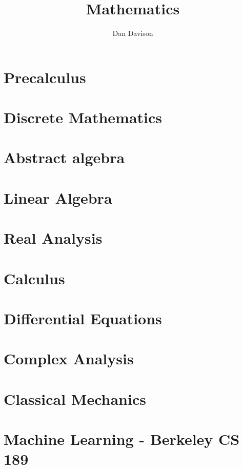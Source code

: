 \documentclass{book}
\title{Mathematics}
\author{Dan Davison}
\begin{document}
\frontmatter
\maketitle
\tableofcontents
\mainmatter


\chapter{Precalculus}


\chapter{Discrete Mathematics}


\chapter{Abstract algebra}


\chapter{Linear Algebra}



\chapter{Real Analysis}


\chapter{Calculus}



\chapter{Differential Equations}


\chapter{Complex Analysis}


\chapter{Classical Mechanics}


\chapter{Machine Learning - Berkeley CS 189}


\end{document}
